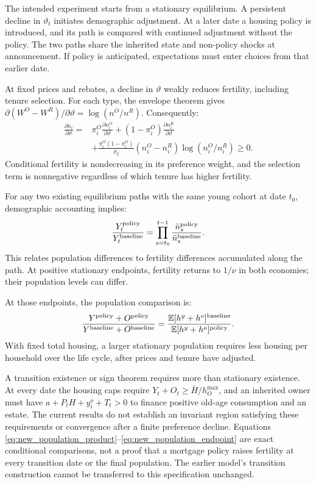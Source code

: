 \documentclass[11pt]{article}
\begin{document}
The intended experiment starts from a stationary equilibrium. A persistent
decline in $\vartheta_t$ initiates demographic adjustment. At a later date a
housing policy is introduced, and its path is compared with continued
adjustment without the policy. The two paths share the inherited state and
non-policy shocks at announcement. If policy is anticipated, expectations
must enter choices from that earlier date.

At fixed prices and rebates, a decline in $\vartheta$ weakly reduces fertility,
including tenure selection. For each type, the envelope theorem gives
$\partial(W^O-W^R)/\partial\vartheta=\log(n^O/n^R)$. Consequently:
\begin{equation}
\begin{aligned}
\frac{\partial\bar n_i}{\partial\vartheta}
={}&\pi_i^O\frac{\partial n_i^O}{\partial\vartheta}
 +(1-\pi_i^O)\frac{\partial n_i^R}{\partial\vartheta}\\
&+\frac{\pi_i^O(1-\pi_i^O)}{\sigma_\xi}
 (n_i^O-n_i^R)\log(n_i^O/n_i^R)\ge0.
\end{aligned}
\label{eq:new_theta_selection}
\end{equation}
Conditional fertility is nondecreasing in its preference weight, and the
selection term is nonnegative regardless of which tenure has higher fertility.

For any two existing equilibrium paths with the same young cohort at date
$t_0$, demographic accounting implies:
\begin{equation}
\frac{Y_t^{\rm policy}}{Y_t^{\rm baseline}}
=\prod_{s=t_0}^{t-1}
 \frac{\bar n_s^{\rm policy}}{\bar n_s^{\rm baseline}}.
\label{eq:new_population_product}
\end{equation}
This relates population differences to fertility differences accumulated
along the path. At positive stationary endpoints, fertility returns to
$1/\nu$ in both economies; their population levels can differ.

At those endpoints, the population comparison is:
\begin{equation}
\frac{Y^{\rm policy}+O^{\rm policy}}
{Y^{\rm baseline}+O^{\rm baseline}}
=\frac{\mathbb E[h^y+h^o]^{\rm baseline}}
{\mathbb E[h^y+h^o]^{\rm policy}}.
\label{eq:new_population_endpoint}
\end{equation}
With fixed total housing, a larger stationary population requires less housing
per household over the life cycle, after prices and tenure have adjusted.

A transition existence or sign theorem requires more than stationary
existence. At every date the housing caps require
$Y_t+O_t\ge\bar H/h_O^{\max}$, and an inherited owner must have
$a+P_tH+y_i^o+T_t>0$ to finance positive old-age consumption and an estate.
The current results do not establish an invariant region satisfying these
requirements or convergence after a finite preference decline. Equations
\eqref{eq:new_population_product}--\eqref{eq:new_population_endpoint} are exact
conditional comparisons, not a proof that a mortgage policy raises fertility
at every transition date or the final population. The earlier model's
transition construction cannot be transferred to this specification unchanged.
\end{document}

